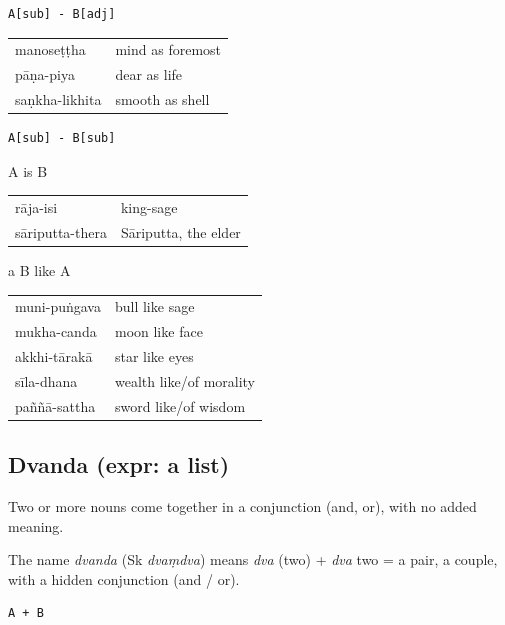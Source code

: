 \documentclass[11pt,oneside]{memoir}
\begin{document}
\begin{verbatim}
A[sub] - B[adj]
\end{verbatim}


\begin{center}
\begin{tabular}{ll}
manoseṭṭha & mind as foremost\\[0pt]
pāṇa-piya & dear as life\\[0pt]
saṇkha-likhita & smooth as shell\\[0pt]
\end{tabular}
\end{center}

\begin{verbatim}
A[sub] - B[sub]
\end{verbatim}


A is B

\begin{center}
\begin{tabular}{ll}
rāja-isi & king-sage\\[0pt]
sāriputta-thera & Sāriputta, the elder\\[0pt]
\end{tabular}
\end{center}

a B like A

\begin{center}
\begin{tabular}{ll}
muni-puṅgava & bull like sage\\[0pt]
mukha-canda & moon like face\\[0pt]
akkhi-tārakā & star like eyes\\[0pt]
sīla-dhana & wealth like/of morality\\[0pt]
paññā-sattha & sword like/of wisdom\\[0pt]
\end{tabular}
\end{center}

\subsection{Dvanda (expr: a list)}
\label{sec:orgc93970e}

Two or more nouns come together in a conjunction (and, or), with no added meaning.

The name \emph{dvanda} (Sk \emph{dvaṃdva}) means \emph{dva} (two) + \emph{dva} two = a pair, a
couple, with a hidden conjunction (and / or).

\begin{verbatim}
A + B
\end{verbatim}
\end{document}

